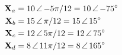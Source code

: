 \begin{answerbox}
\begin{align*}
  \mathbf{X}_a &= 10\,\angle\,\mathord{-5\pi/12} = 10\,\angle\,\mathord{-75^\circ} \\
  \mathbf{X}_b &= 15\,\angle\,\mathord{\pi/12}   = 15\,\angle\,\mathord{15^\circ}  \\
  \mathbf{X}_c &= 12\,\angle\,\mathord{5\pi/12}  = 12\,\angle\,\mathord{75^\circ}  \\
  \mathbf{X}_d &= 8\,\angle\,\mathord{11\pi/12}  = 8\,\angle\,\mathord{165^\circ}
\end{align*}
\end{answerbox}


